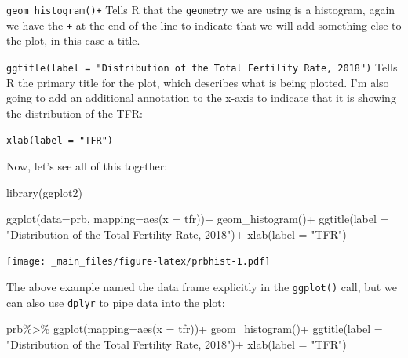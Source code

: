 \documentclass[
]{book}
\newenvironment{Shaded}{\begin{snugshade}}{\end{snugshade}}
\newcommand{\AttributeTok}[1]{\textcolor[rgb]{0.77,0.63,0.00}{#1}}
\newcommand{\FunctionTok}[1]{\textcolor[rgb]{0.00,0.00,0.00}{#1}}
\newcommand{\NormalTok}[1]{#1}
\newcommand{\SpecialCharTok}[1]{\textcolor[rgb]{0.00,0.00,0.00}{#1}}
\newcommand{\StringTok}[1]{\textcolor[rgb]{0.31,0.60,0.02}{#1}}
\begin{document}
\texttt{geom\_histogram()+} Tells R that the \texttt{geom}etry we are using is a
histogram, again we have the \texttt{+} at the end of the line to indicate that
we will add something else to the plot, in this case a title.

\texttt{ggtitle(label\ =\ "Distribution\ of\ the\ Total\ Fertility\ Rate,\ 2018")}
Tells R the primary title for the plot, which describes what is being
plotted. I'm also going to add an additional annotation to the x-axis to
indicate that it is showing the distribution of the TFR:

\texttt{xlab(label\ =\ "TFR")}

Now, let's see all of this together:

\begin{Shaded}
\begin{Highlighting}[]
\FunctionTok{library}\NormalTok{(ggplot2)}

\FunctionTok{ggplot}\NormalTok{(}\AttributeTok{data=}\NormalTok{prb,}
       \AttributeTok{mapping=}\FunctionTok{aes}\NormalTok{(}\AttributeTok{x =}\NormalTok{ tfr))}\SpecialCharTok{+}
  \FunctionTok{geom\_histogram}\NormalTok{()}\SpecialCharTok{+}
  \FunctionTok{ggtitle}\NormalTok{(}\AttributeTok{label =} \StringTok{"Distribution of the Total Fertility Rate, 2018"}\NormalTok{)}\SpecialCharTok{+}
  \FunctionTok{xlab}\NormalTok{(}\AttributeTok{label =} \StringTok{"TFR"}\NormalTok{)}
\end{Highlighting}
\end{Shaded}

\texttt{[image: \_main\_files/figure-latex/prbhist-1.pdf]}

The above example named the data frame explicitly in the \texttt{ggplot()}
call, but we can also use \texttt{dplyr} to pipe data into the plot:

\begin{Shaded}
\begin{Highlighting}[]
\NormalTok{prb}\SpecialCharTok{\%\textgreater{}\%}
  \FunctionTok{ggplot}\NormalTok{(}\AttributeTok{mapping=}\FunctionTok{aes}\NormalTok{(}\AttributeTok{x =}\NormalTok{ tfr))}\SpecialCharTok{+}
  \FunctionTok{geom\_histogram}\NormalTok{()}\SpecialCharTok{+}
  \FunctionTok{ggtitle}\NormalTok{(}\AttributeTok{label =} \StringTok{"Distribution of the Total Fertility Rate, 2018"}\NormalTok{)}\SpecialCharTok{+}
  \FunctionTok{xlab}\NormalTok{(}\AttributeTok{label =} \StringTok{"TFR"}\NormalTok{)}
\end{Highlighting}
\end{Shaded}
\end{document}
